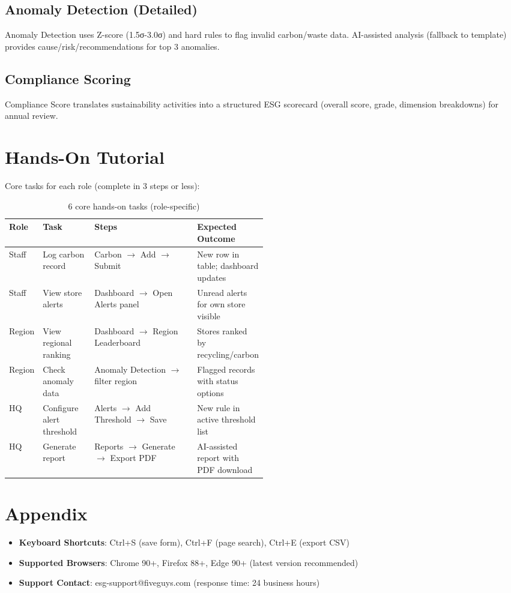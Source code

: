 \documentclass[11pt,a4paper]{article}
\begin{document}
\subsection{Anomaly Detection (Detailed)}
Anomaly Detection uses Z-score (1.5σ-3.0σ) and hard rules to flag invalid carbon/waste data. AI-assisted analysis (fallback to template) provides cause/risk/recommendations for top 3 anomalies.

\subsection{Compliance Scoring}
Compliance Score translates sustainability activities into a structured ESG scorecard (overall score, grade, dimension breakdowns) for annual review.

\section{Hands-On Tutorial}
Core tasks for each role (complete in 3 steps or less):

\begin{table}[H]
\centering
\scriptsize
\begin{tabularx}{\linewidth}{@{}p{0.08\linewidth}p{0.20\linewidth}Xp{0.22\linewidth}@{}}
\toprule
\textbf{Role} & \textbf{Task} & \textbf{Steps} & \textbf{Expected Outcome} \\
\midrule
Staff  & Log carbon record    & Carbon $\to$ Add $\to$ Submit              & New row in table; dashboard updates       \\
Staff  & View store alerts    & Dashboard $\to$ Open Alerts panel          & Unread alerts for own store visible       \\
Region & View regional ranking& Dashboard $\to$ Region Leaderboard         & Stores ranked by recycling/carbon         \\
Region & Check anomaly data   & Anomaly Detection $\to$ filter region      & Flagged records with status options       \\
HQ     & Configure alert threshold & Alerts $\to$ Add Threshold $\to$ Save    & New rule in active threshold list         \\
HQ     & Generate report      & Reports $\to$ Generate $\to$ Export PDF    & AI-assisted report with PDF download      \\
\bottomrule
\end{tabularx}
\caption{6 core hands-on tasks (role-specific)}
\label{tab:walkthrough}
\end{table}

\section*{Appendix}
\begin{itemize}[leftmargin=1.4em,itemsep=2pt]
    \item \textbf{Keyboard Shortcuts}: Ctrl+S (save form), Ctrl+F (page search), Ctrl+E (export CSV)
    \item \textbf{Supported Browsers}: Chrome 90+, Firefox 88+, Edge 90+ (latest version recommended)
    \item \textbf{Support Contact}: esg-support@fiveguys.com (response time: 24 business hours)
\end{itemize}
\end{document}
